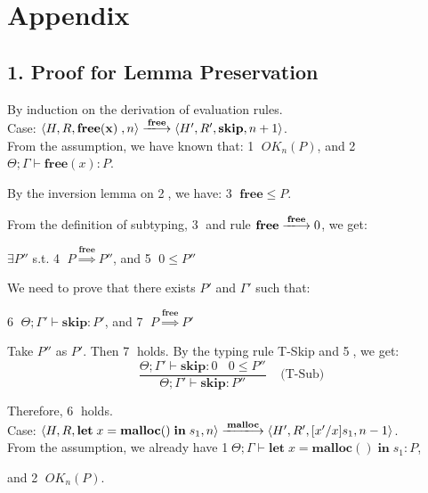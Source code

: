 \documentclass[english]{jssst_ppl} %
\newcommand\LET{\mathbf{let}\;}
\newcommand\FREE{\mathbf{free(x)}\;}
\newcommand\IN{\mathbf{in}\;}
\newcommand\SKIP{\mathbf{skip}}
\newcommand\Rtab{\; \; \; \;}
\newcommand\MALLOC{\mathbf{malloc()}\;}
\newcommand\Malloc{\mathbf{malloc}}
\newcommand\Free{\mathbf{free}}
\newcommand\Cirx{(x)}
\theoremstyle{definition}
\begin{document}
\newpage
\appendix
\section*{Appendix}
\subsection*{1. Proof for Lemma Preservation}

By induction on the derivation of evaluation rules.\\

\noindent Case: $\langle H, R, \FREE, n \rangle \xlongrightarrow{\Free} \langle H', R', \SKIP, n + 1 \rangle $. \\

From the assumption, we have known that: \textcircled{1} $OK_{n}(P)$, and \textcircled{2} $\Theta; \Gamma \vdash \Free\Cirx:P$.

By the inversion lemma on \textcircled{2}, we have: \textcircled{3} $\Free \le P$.

From the definition of subtyping, \textcircled{3} and rule $\Free \xlongrightarrow{\Free} 0$, we get:
\begin{center}
$\exists P''$ s.t. \textcircled{4} $P \overset{\text{$\Free$}}{\Longrightarrow} P''$,  and \textcircled{5} $0 \le P''$
\end{center}

We need to prove that there exists $P'$ and $\Gamma'$ such that:
\begin{center}
\textcircled{6} $\Theta; \Gamma' \vdash \SKIP: P'$,  and \textcircled{7} $P \overset{\text{$\Free$}}{\Longrightarrow} P'$
\end{center}

Take $P''$ as $P'$. Then \textcircled{7} holds. By the typing rule T-Skip and \textcircled{5}, we get:
$$
   \frac{\Theta; \Gamma' \vdash \SKIP : 0 \ \ \ \  0 \le P''}
   {\Theta; \Gamma' \vdash \SKIP : P''}
   \Rtab \mbox{(T-Sub)}
$$

Therefore, \textcircled{6} holds. \\

\noindent Case: $\langle H, R, \LET x = \MALLOC \IN s_{1}, n \rangle \xlongrightarrow{\Malloc} \langle H', R', [x'/x]s_{1}, n - 1  \rangle $.\\

From the assumption, we already have \textcircled{1}$\Theta; \Gamma \vdash \LET x = \MALLOC \IN s_{1} : P$,

and \textcircled{2} $OK_{n}(P)$.
\end{document}
